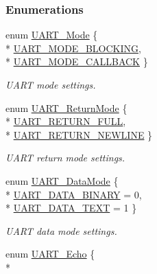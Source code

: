 \subsubsection*{Enumerations}
\begin{DoxyCompactItemize}
\item 
enum \hyperlink{_u_a_r_t_8h_a2507a620dba95cd20885c52494d19e90}{U\+A\+R\+T\+\_\+\+Mode} \{ \\*
\hyperlink{_u_a_r_t_8h_a2507a620dba95cd20885c52494d19e90ae6b6bd5d2d5df859ad6724e89e605ebf}{U\+A\+R\+T\+\_\+\+M\+O\+D\+E\+\_\+\+B\+L\+O\+C\+K\+I\+N\+G}, 
\\*
\hyperlink{_u_a_r_t_8h_a2507a620dba95cd20885c52494d19e90ae0dbd9b5195e56c3c2aed10163523754}{U\+A\+R\+T\+\_\+\+M\+O\+D\+E\+\_\+\+C\+A\+L\+L\+B\+A\+C\+K}
 \}
\begin{DoxyCompactList}\small\item\em U\+A\+R\+T mode settings. \end{DoxyCompactList}\item 
enum \hyperlink{_u_a_r_t_8h_acb5a82843435a1b5d51b6c27028d914f}{U\+A\+R\+T\+\_\+\+Return\+Mode} \{ \\*
\hyperlink{_u_a_r_t_8h_acb5a82843435a1b5d51b6c27028d914fa50c07cbaf7518a0acd14137e801687e5}{U\+A\+R\+T\+\_\+\+R\+E\+T\+U\+R\+N\+\_\+\+F\+U\+L\+L}, 
\\*
\hyperlink{_u_a_r_t_8h_acb5a82843435a1b5d51b6c27028d914fa3b8e419e0e12abf80b25f72d17745f76}{U\+A\+R\+T\+\_\+\+R\+E\+T\+U\+R\+N\+\_\+\+N\+E\+W\+L\+I\+N\+E}
 \}
\begin{DoxyCompactList}\small\item\em U\+A\+R\+T return mode settings. \end{DoxyCompactList}\item 
enum \hyperlink{_u_a_r_t_8h_a694090fdb166f94ac30b809f9cba87b8}{U\+A\+R\+T\+\_\+\+Data\+Mode} \{ \\*
\hyperlink{_u_a_r_t_8h_a694090fdb166f94ac30b809f9cba87b8aaa8edcbf6c236b0d86491ea1e7c9e4d8}{U\+A\+R\+T\+\_\+\+D\+A\+T\+A\+\_\+\+B\+I\+N\+A\+R\+Y} = 0, 
\\*
\hyperlink{_u_a_r_t_8h_a694090fdb166f94ac30b809f9cba87b8a87fdfb7ca981eab7f56c51380fd7094e}{U\+A\+R\+T\+\_\+\+D\+A\+T\+A\+\_\+\+T\+E\+X\+T} = 1
 \}
\begin{DoxyCompactList}\small\item\em U\+A\+R\+T data mode settings. \end{DoxyCompactList}\item 
enum \hyperlink{_u_a_r_t_8h_aac6a03c2e1d76f53e1d9d923dcdc24f2}{U\+A\+R\+T\+\_\+\+Echo} \{ \\*

\end{DoxyCompactItemize}

